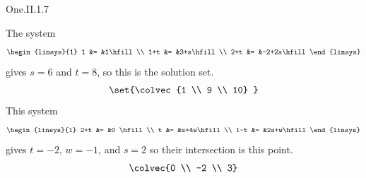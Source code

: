 \begin{ans}{One.II.1.7}
       \begin{exparts}
        \partsitem The system
          \begin{equation*}
            \begin{linsys}{1}
              1     &= &1\hfill         \\
              1+t   &= &3+s\hfill         \\
              2+t   &= &-2+2s\hfill
            \end{linsys}
          \end{equation*}
          gives \( s=6 \) and \( t=8 \), so this is the solution set.
          \begin{equation*}
            \set{\colvec{1 \\ 9 \\ 10}     }
          \end{equation*}
        \partsitem This system
          \begin{equation*}
            \begin{linsys}{1}
            2+t   &=  &0 \hfill        \\
            t     &=  &s+4w\hfill        \\
            1-t   &=  &2s+w\hfill
            \end{linsys}
          \end{equation*}
          gives \( t=-2 \), \( w=-1 \), and \( s=2 \) so their intersection
          is this point.
          \begin{equation*}
            \colvec{0 \\ -2 \\ 3}
          \end{equation*}
      \end{exparts}
    
\end{ans}
